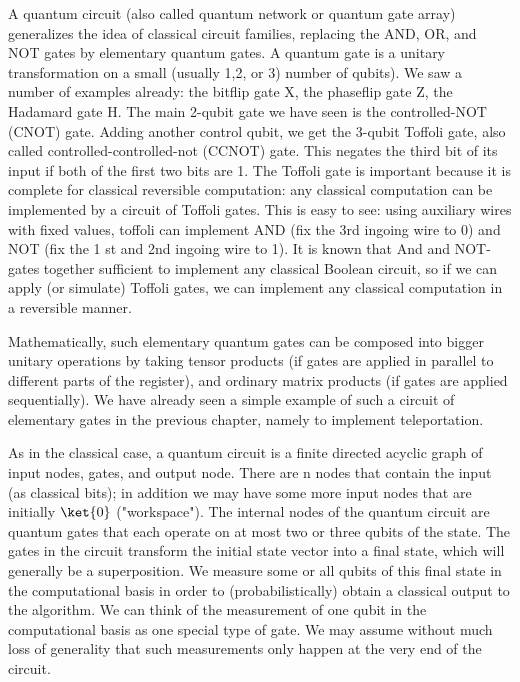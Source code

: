 \documentclass[12pt, oneside]{book}
\theoremstyle{definition}
\theoremstyle{definition}
\theoremstyle{remark}
\begin{document}
A quantum circuit (also called quantum network or quantum gate array) generalizes the idea of classical circuit families, replacing the AND, OR, and NOT gates by elementary quantum gates. A quantum gate is a unitary transformation on a small (usually 1,2, or 3) number of qubits). We saw a number of examples already: the bitflip gate X, the phaseflip gate Z, the Hadamard gate H. The main 2-qubit gate we have seen is the controlled-NOT (CNOT) gate. Adding another control qubit, we get the 3-qubit Toffoli gate, also called controlled-controlled-not (CCNOT) gate. This negates the third bit of its input if both of the first two bits are 1. The Toffoli gate is important because it is complete for classical reversible computation: any classical computation can be implemented by a circuit of Toffoli gates. This is easy to see: using auxiliary wires with fixed values, toffoli can implement AND (fix the 3rd ingoing wire to 0) and NOT (fix the 1 st and 2nd ingoing wire to 1). It is known that And and NOT-gates together sufficient to implement any classical Boolean circuit, so if we can apply (or simulate) Toffoli gates, we can implement any classical computation in a reversible manner.

Mathematically, such elementary quantum gates can be composed into bigger unitary operations by taking tensor products (if gates are applied in parallel to different parts of the register), and ordinary matrix products (if gates are applied sequentially). We have already seen a simple example of such a circuit of elementary gates in the previous chapter, namely to implement teleportation.

As in the classical case, a quantum circuit is a finite directed acyclic graph of input nodes, gates, and output node. There are n nodes that contain the input (as classical bits); in addition we may have some more input nodes that are initially $\ket{0}$ ("workspace"). The internal nodes of the quantum circuit are quantum gates that each operate on at most two or three qubits of the state. The gates in the circuit transform the initial state vector into a final state, which will generally be a superposition. We measure some or all qubits of this final state in the computational basis in order to (probabilistically) obtain a classical output to the algorithm. We can think of the measurement of one qubit in the computational basis as one special type of gate. We may assume without much loss of generality that such measurements only happen at the very end of the circuit. 
\end{document}
